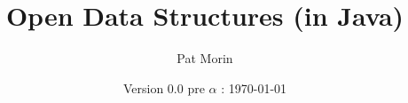 \documentclass[11pt]{book}
\title{Open Data Structures (in Java)}
\author{Pat Morin}
\date{Version 0.0 pre $\alpha$ : \today}
\begin{document}
\begin{titlepage}
  \maketitle
\end{titlepage}

\ \thispagestyle{empty}\newpage

\setcounter{page}{1}


\tableofcontents












\end{document}
